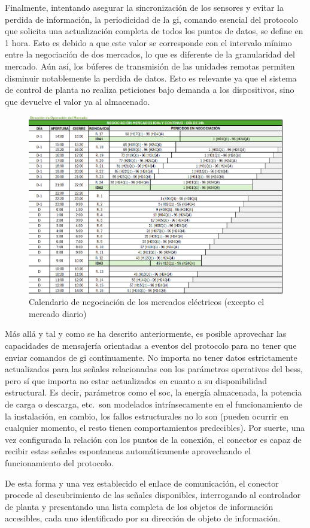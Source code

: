 Finalmente, intentando asegurar la sincronización de los sensores y evitar la perdida de información, la periodicidad de la \gls{gi}, comando esencial del protocolo que solicita una actualización completa de todos los puntos de datos, se define en 1 hora. Esto es debido a que este valor se corresponde con el intervalo mínimo entre la negociación de dos mercados, lo que es diferente de la granularidad del mercado. Aún así, los búferes de transmisión de las unidades remotas permiten disminuir notablemente la perdida de datos. Esto es relevante ya que el sistema de control de planta no realiza peticiones bajo demanda a los dispositivos, sino que devuelve el valor ya al almacenado.

\begin{figure}
  \centering
  \includegraphics[width=0.5\linewidth]{figures/tiempo-mercados.png}
  \caption{Calendario de negociación de los mercados eléctricos (excepto el mercado diario)~\cite{omie2025mercado}}
  \label{fig:tiempo-mercados}
\end{figure}

Más allá y tal y como se ha descrito anteriormente, es posible aprovechar las capacidades de mensajería orientadas a eventos del protocolo para no tener que enviar comandos de \gls{gi} continuamente. No importa no tener datos estrictamente actualizados para las señales relacionadas con los parámetros operativos del \gls{bess}, pero sí que importa no estar actualizados en cuanto a su disponibilidad estructural. Es decir, parámetros como el \gls{soc}, la energía almacenada, la potencia de carga o descarga, etc.\ son modelados intrínsecamente en el funcionamiento de la instalación, en cambio, los fallos estructurales no lo son (pueden ocurrir en cualquier momento, el resto tienen comportamientos predecibles). Por suerte, una vez configurada la relación con los puntos de la conexión, el conector es capaz de recibir estas señales espontaneas automáticamente aprovechando el funcionamiento del protocolo.

De esta forma y una vez establecido el enlace de comunicación, el conector procede al descubrimiento de las señales disponibles, interrogando al controlador de planta y presentando una lista completa de los objetos de información accesibles, cada uno identificado por su dirección de objeto de información.

